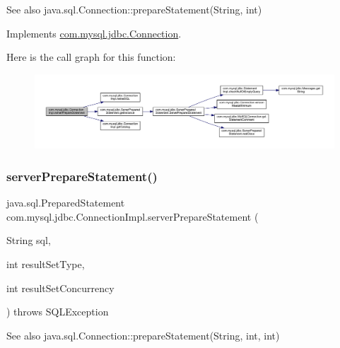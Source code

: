 \begin{DoxySeeAlso}{See also}
java.\+sql.\+Connection\+::prepare\+Statement(\+String, int) 
\end{DoxySeeAlso}


Implements \mbox{\hyperlink{interfacecom_1_1mysql_1_1jdbc_1_1_connection_ab063bf6d934fba06ba65eaa68aa06ef6}{com.\+mysql.\+jdbc.\+Connection}}.

Here is the call graph for this function\+:\nopagebreak
\begin{figure}[H]
\begin{center}
\leavevmode
\includegraphics[width=350pt]{classcom_1_1mysql_1_1jdbc_1_1_connection_impl_a03fa01b17c7f7166c578fcd596fb9a8a_cgraph}
\end{center}
\end{figure}
\mbox{\label{classcom_1_1mysql_1_1jdbc_1_1_connection_impl_af4efc83e3fa843f0acaa4bc786d42237}} 
\subsubsection{\texorpdfstring{server\+Prepare\+Statement()}{serverPrepareStatement()}\hspace{0.1cm}{\footnotesize\ttfamily [3/6]}}
{\footnotesize\ttfamily java.\+sql.\+Prepared\+Statement com.\+mysql.\+jdbc.\+Connection\+Impl.\+server\+Prepare\+Statement (\begin{DoxyParamCaption}\item[{String}]{sql,  }\item[{int}]{result\+Set\+Type,  }\item[{int}]{result\+Set\+Concurrency }\end{DoxyParamCaption}) throws S\+Q\+L\+Exception}

\begin{DoxySeeAlso}{See also}
java.\+sql.\+Connection\+::prepare\+Statement(\+String, int, int) 
\end{DoxySeeAlso}


